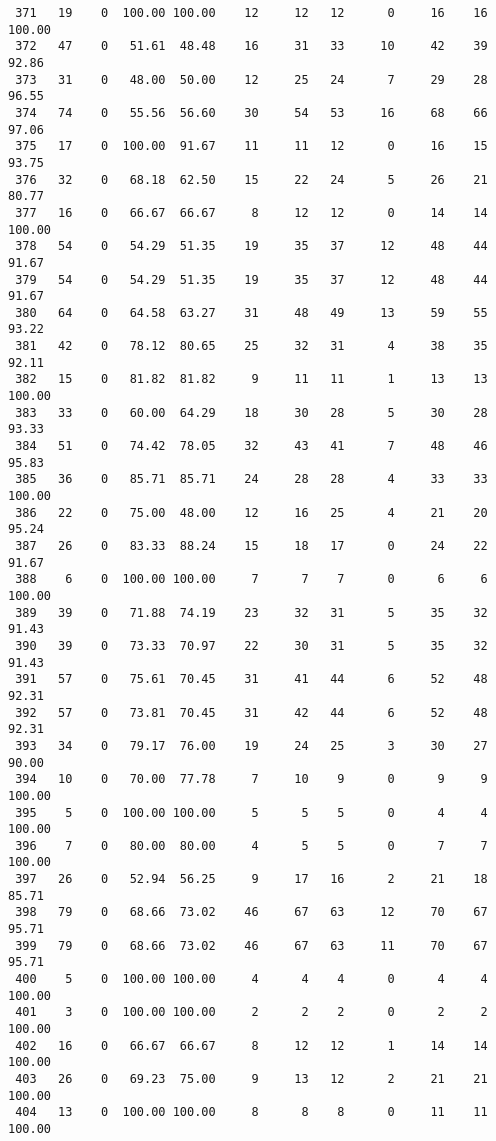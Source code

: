 \begin{verbatim}
 371   19    0  100.00 100.00    12     12   12      0     16    16   100.00
 372   47    0   51.61  48.48    16     31   33     10     42    39    92.86
 373   31    0   48.00  50.00    12     25   24      7     29    28    96.55
 374   74    0   55.56  56.60    30     54   53     16     68    66    97.06
 375   17    0  100.00  91.67    11     11   12      0     16    15    93.75
 376   32    0   68.18  62.50    15     22   24      5     26    21    80.77
 377   16    0   66.67  66.67     8     12   12      0     14    14   100.00
 378   54    0   54.29  51.35    19     35   37     12     48    44    91.67
 379   54    0   54.29  51.35    19     35   37     12     48    44    91.67
 380   64    0   64.58  63.27    31     48   49     13     59    55    93.22
 381   42    0   78.12  80.65    25     32   31      4     38    35    92.11
 382   15    0   81.82  81.82     9     11   11      1     13    13   100.00
 383   33    0   60.00  64.29    18     30   28      5     30    28    93.33
 384   51    0   74.42  78.05    32     43   41      7     48    46    95.83
 385   36    0   85.71  85.71    24     28   28      4     33    33   100.00
 386   22    0   75.00  48.00    12     16   25      4     21    20    95.24
 387   26    0   83.33  88.24    15     18   17      0     24    22    91.67
 388    6    0  100.00 100.00     7      7    7      0      6     6   100.00
 389   39    0   71.88  74.19    23     32   31      5     35    32    91.43
 390   39    0   73.33  70.97    22     30   31      5     35    32    91.43
 391   57    0   75.61  70.45    31     41   44      6     52    48    92.31
 392   57    0   73.81  70.45    31     42   44      6     52    48    92.31
 393   34    0   79.17  76.00    19     24   25      3     30    27    90.00
 394   10    0   70.00  77.78     7     10    9      0      9     9   100.00
 395    5    0  100.00 100.00     5      5    5      0      4     4   100.00
 396    7    0   80.00  80.00     4      5    5      0      7     7   100.00
 397   26    0   52.94  56.25     9     17   16      2     21    18    85.71
 398   79    0   68.66  73.02    46     67   63     12     70    67    95.71
 399   79    0   68.66  73.02    46     67   63     11     70    67    95.71
 400    5    0  100.00 100.00     4      4    4      0      4     4   100.00
 401    3    0  100.00 100.00     2      2    2      0      2     2   100.00
 402   16    0   66.67  66.67     8     12   12      1     14    14   100.00
 403   26    0   69.23  75.00     9     13   12      2     21    21   100.00
 404   13    0  100.00 100.00     8      8    8      0     11    11   100.00

\end{verbatim}
